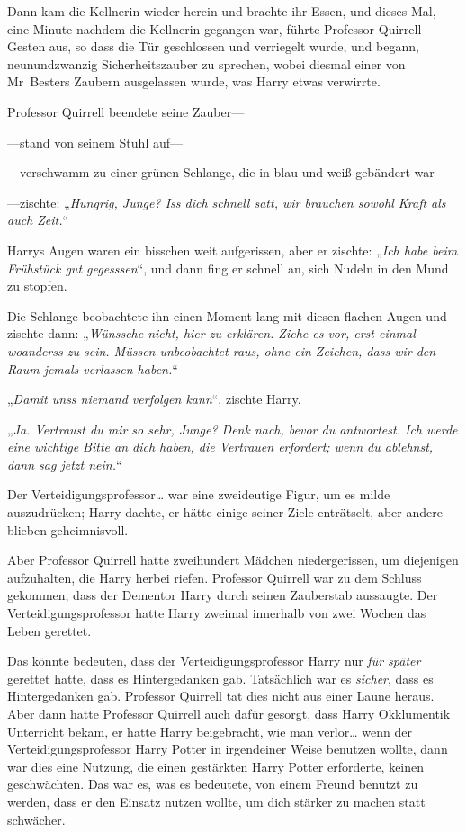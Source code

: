 {Dann kam die Kellnerin wieder herein und brachte ihr Essen, und dieses Mal, eine Minute nachdem die Kellnerin gegangen war, führte Professor Quirrell Gesten aus, so dass die Tür geschlossen und verriegelt wurde, und begann, neunundzwanzig Sicherheitszauber zu sprechen, wobei diesmal einer von Mr~Besters Zaubern ausgelassen wurde, was Harry etwas verwirrte.

Professor Quirrell beendete seine Zauber—

—stand von seinem Stuhl auf—

—verschwamm zu einer grünen Schlange, die in blau und weiß gebändert war—

—zischte: „\emph{Hungrig, Junge? Iss dich schnell satt, wir brauchen sowohl Kraft als auch Zeit.}“

Harrys Augen waren ein bisschen weit aufgerissen, aber er zischte: „\emph{Ich habe beim Frühstück gut gegesssen}“, und dann fing er schnell an, sich Nudeln in den Mund zu stopfen.

Die Schlange beobachtete ihn einen Moment lang mit diesen flachen Augen und zischte dann: „\emph{Wünssche nicht, hier zu erklären. Ziehe es vor, erst einmal woanderss zu sein. Müssen unbeobachtet raus, ohne ein Zeichen, dass wir den Raum jemals verlassen haben.}“

„\emph{Damit unss niemand verfolgen kann}“, zischte Harry.

„\emph{Ja. Vertraust du mir so sehr, Junge? Denk nach, bevor du antwortest. Ich werde eine wichtige Bitte an dich haben, die Vertrauen erfordert; wenn du ablehnst, dann sag jetzt nein.}“

Der Verteidigungsprofessor… war eine zweideutige Figur, um es milde auszudrücken; Harry dachte, er hätte einige seiner Ziele enträtselt, aber andere blieben geheimnisvoll.

Aber Professor Quirrell hatte zweihundert Mädchen niedergerissen, um diejenigen aufzuhalten, die Harry herbei riefen. Professor Quirrell war zu dem Schluss gekommen, dass der Dementor Harry durch seinen Zauberstab aussaugte. Der Verteidigungsprofessor hatte Harry zweimal innerhalb von zwei Wochen das Leben gerettet.

Das könnte bedeuten, dass der Verteidigungsprofessor Harry nur \emph{für später} gerettet hatte, dass es Hintergedanken gab. Tatsächlich war es \emph{sicher}, dass es Hintergedanken gab. Professor Quirrell tat dies nicht aus einer Laune heraus. Aber dann hatte Professor Quirrell auch dafür gesorgt, dass Harry Okklumentik Unterricht bekam, er hatte Harry beigebracht, wie man verlor… wenn der Verteidigungsprofessor Harry Potter in irgendeiner Weise benutzen wollte, dann war dies eine Nutzung, die einen gestärkten Harry Potter erforderte, keinen geschwächten. Das war es, was es bedeutete, von einem Freund benutzt zu werden, dass er den Einsatz nutzen wollte, um dich stärker zu machen statt schwächer.

}
